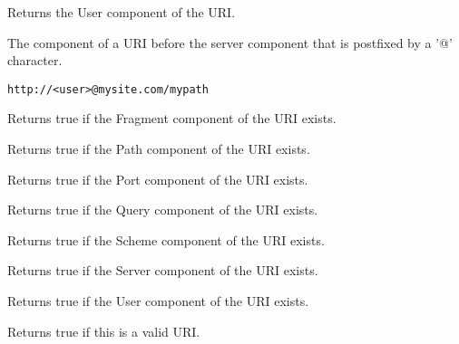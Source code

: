 
Returns the User component of the URI.

The component of a URI before the server component
that is postfixed by a '@' character.

\tt{http://<user>@mysite.com/mypath}

\label{wxurihasfragment}


Returns true if the Fragment component of the URI exists.

\label{wxurihaspath}


Returns true if the Path component of the URI exists.

\label{wxurihasport}


Returns true if the Port component of the URI exists.


\label{wxurihasquery}


Returns true if the Query component of the URI exists.


\label{wxurihasscheme}


Returns true if the Scheme component of the URI exists.


\label{wxurihasserver}


Returns true if the Server component of the URI exists.


\label{wxurihasuser}


Returns true if the User component of the URI exists.


\label{wxuriisok}


Returns true if this is a valid URI. 


\label{wxuriisreference}


